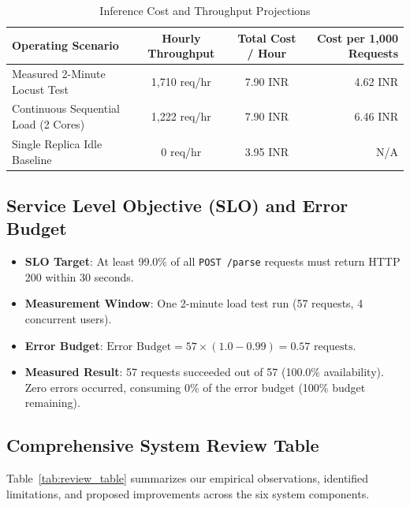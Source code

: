 \documentclass[10pt,a4paper]{article}
\begin{document}
\begin{table}[h]
\centering
\small
\caption{Inference Cost and Throughput Projections}
\label{tab:cost_projections}
\setlength{\tabcolsep}{5pt}
\begin{tabular}{|l|c|c|r|}
\hline
\textbf{Operating Scenario} & \textbf{Hourly Throughput} & \textbf{Total Cost / Hour} & \textbf{Cost per 1,000 Requests} \\
\hline
Measured 2-Minute Locust Test & 1,710 req/hr & 7.90 INR & 4.62 INR \\
\hline
Continuous Sequential Load (2 Cores) & 1,222 req/hr & 7.90 INR & 6.46 INR \\
\hline
Single Replica Idle Baseline & 0 req/hr & 3.95 INR & N/A \\
\hline
\end{tabular}
\end{table}

\subsection{Service Level Objective (SLO) and Error Budget}
\begin{itemize}
    \item \textbf{SLO Target}: At least 99.0\% of all \texttt{POST /parse} requests must return HTTP 200 within 30 seconds.
    \item \textbf{Measurement Window}: One 2-minute load test run (57 requests, 4 concurrent users).
    \item \textbf{Error Budget}: $\text{Error Budget} = 57 \times (1.0 - 0.99) = 0.57\text{ requests}$.
    \item \textbf{Measured Result}: 57 requests succeeded out of 57 (100.0\% availability). Zero errors occurred, consuming 0\% of the error budget (100\% budget remaining).
\end{itemize}

\subsection{Comprehensive System Review Table}
Table~\ref{tab:review_table} summarizes our empirical observations, identified limitations, and proposed improvements across the six system components.
\end{document}
